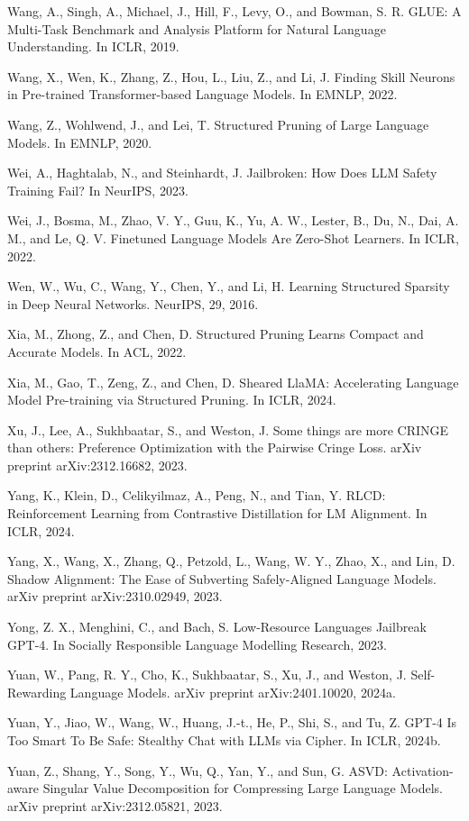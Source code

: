 \documentclass[10pt]{article}
\begin{document}
Wang, A., Singh, A., Michael, J., Hill, F., Levy, O., and Bowman, S. R. GLUE: A Multi-Task Benchmark and Analysis Platform for Natural Language Understanding. In ICLR, 2019.

Wang, X., Wen, K., Zhang, Z., Hou, L., Liu, Z., and Li, J. Finding Skill Neurons in Pre-trained Transformer-based Language Models. In EMNLP, 2022.

Wang, Z., Wohlwend, J., and Lei, T. Structured Pruning of Large Language Models. In EMNLP, 2020.

Wei, A., Haghtalab, N., and Steinhardt, J. Jailbroken: How Does LLM Safety Training Fail? In NeurIPS, 2023.

Wei, J., Bosma, M., Zhao, V. Y., Guu, K., Yu, A. W., Lester, B., Du, N., Dai, A. M., and Le, Q. V. Finetuned Language Models Are Zero-Shot Learners. In ICLR, 2022.

Wen, W., Wu, C., Wang, Y., Chen, Y., and Li, H. Learning Structured Sparsity in Deep Neural Networks. NeurIPS, 29, 2016.

Xia, M., Zhong, Z., and Chen, D. Structured Pruning Learns Compact and Accurate Models. In ACL, 2022.

Xia, M., Gao, T., Zeng, Z., and Chen, D. Sheared LlaMA: Accelerating Language Model Pre-training via Structured Pruning. In ICLR, 2024.

Xu, J., Lee, A., Sukhbaatar, S., and Weston, J. Some things are more CRINGE than others: Preference Optimization with the Pairwise Cringe Loss. arXiv preprint arXiv:2312.16682, 2023.

Yang, K., Klein, D., Celikyilmaz, A., Peng, N., and Tian, Y. RLCD: Reinforcement Learning from Contrastive Distillation for LM Alignment. In ICLR, 2024.

Yang, X., Wang, X., Zhang, Q., Petzold, L., Wang, W. Y., Zhao, X., and Lin, D. Shadow Alignment: The Ease of Subverting Safely-Aligned Language Models. arXiv preprint arXiv:2310.02949, 2023.

Yong, Z. X., Menghini, C., and Bach, S. Low-Resource Languages Jailbreak GPT-4. In Socially Responsible Language Modelling Research, 2023.

Yuan, W., Pang, R. Y., Cho, K., Sukhbaatar, S., Xu, J., and Weston, J. Self-Rewarding Language Models. arXiv preprint arXiv:2401.10020, 2024a.

Yuan, Y., Jiao, W., Wang, W., Huang, J.-t., He, P., Shi, S., and Tu, Z. GPT-4 Is Too Smart To Be Safe: Stealthy Chat with LLMs via Cipher. In ICLR, 2024b.

Yuan, Z., Shang, Y., Song, Y., Wu, Q., Yan, Y., and Sun, G. ASVD: Activation-aware Singular Value Decomposition for Compressing Large Language Models. arXiv preprint arXiv:2312.05821, 2023.
\end{document}
